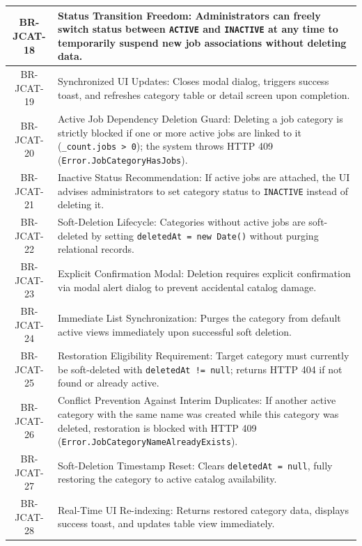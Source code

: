 \begin{longtable}{|c|p{12cm}|}
    BR-JCAT-18 & Status Transition Freedom: Administrators can freely switch status between \texttt{ACTIVE} and \texttt{INACTIVE} at any time to temporarily suspend new job associations without deleting data. \\ \hline
    BR-JCAT-19 & Synchronized UI Updates: Closes modal dialog, triggers success toast, and refreshes category table or detail screen upon completion. \\ \hline
    BR-JCAT-20 & Active Job Dependency Deletion Guard: Deleting a job category is strictly blocked if one or more active jobs are linked to it (\texttt{\_count.jobs > 0}); the system throws HTTP 409 (\texttt{Error.\allowbreak Job\allowbreak Category\allowbreak Has\allowbreak Jobs}). \\ \hline
    BR-JCAT-21 & Inactive Status Recommendation: If active jobs are attached, the UI advises administrators to set category status to \texttt{INACTIVE} instead of deleting it. \\ \hline
    BR-JCAT-22 & Soft-Deletion Lifecycle: Categories without active jobs are soft-deleted by setting \texttt{deletedAt = new Date()} without purging relational records. \\ \hline
    BR-JCAT-23 & Explicit Confirmation Modal: Deletion requires explicit confirmation via modal alert dialog to prevent accidental catalog damage. \\ \hline
    BR-JCAT-24 & Immediate List Synchronization: Purges the category from default active views immediately upon successful soft deletion. \\ \hline
    BR-JCAT-25 & Restoration Eligibility Requirement: Target category must currently be soft-deleted with \texttt{deletedAt != null}; returns HTTP 404 if not found or already active. \\ \hline
    BR-JCAT-26 & Conflict Prevention Against Interim Duplicates: If another active category with the same name was created while this category was deleted, restoration is blocked with HTTP 409 (\texttt{Error.\allowbreak Job\allowbreak Category\allowbreak Name\allowbreak Already\allowbreak Exists}). \\ \hline
    BR-JCAT-27 & Soft-Deletion Timestamp Reset: Clears \texttt{deletedAt = null}, fully restoring the category to active catalog availability. \\ \hline
    BR-JCAT-28 & Real-Time UI Re-indexing: Returns restored category data, displays success toast, and updates table view immediately. \\ \hline
\end{longtable}
